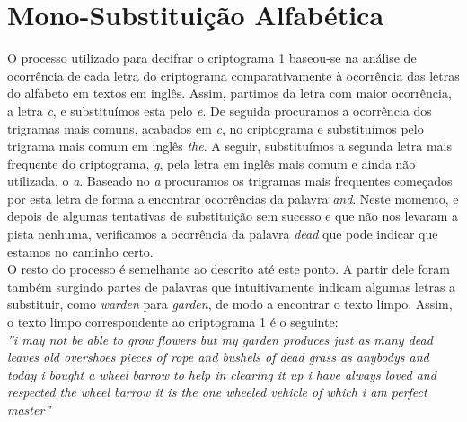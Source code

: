 \section{Mono-Substituição Alfabética}
O processo utilizado para decifrar o criptograma 1 baseou-se na análise de ocorrência de cada letra do criptograma comparativamente à ocorrência das letras do alfabeto em textos em inglês. Assim, partimos da letra com maior ocorrência, a letra \textit{c}, e substituímos esta pelo \textit{e}. De seguida procuramos a ocorrência dos trigramas mais comuns, acabados em \textit{c}, no criptograma e substituímos pelo trigrama mais comum em inglês \textit{the}. A seguir, substituímos a segunda letra mais frequente do criptograma, \textit{g}, pela letra em inglês mais comum e ainda não utilizada, o \textit{a}. Baseado no \textit{a} procuramos os trigramas mais frequentes começados por esta letra de forma a encontrar ocorrências da palavra \textit{and}. Neste momento, e depois de algumas tentativas de substituição sem sucesso e que não nos levaram a pista nenhuma, verificamos a ocorrência da palavra \textit{dead} que pode indicar que estamos no caminho certo.\\
O resto do processo é semelhante ao descrito até este ponto. A partir dele foram também surgindo partes de palavras que intuitivamente indicam algumas letras a substituir, como \textit{warden} para \textit{garden}, de modo a encontrar o texto limpo. Assim, o texto limpo correspondente ao criptograma 1 é o seguinte:\\
\textit{''i may not be able to grow flowers but my garden produces just as many dead leaves old overshoes pieces of rope and bushels of dead grass as anybodys and today i bought a wheel barrow to help in clearing it up i have always loved and respected the wheel barrow it is the one wheeled vehicle of which i am perfect master''}
